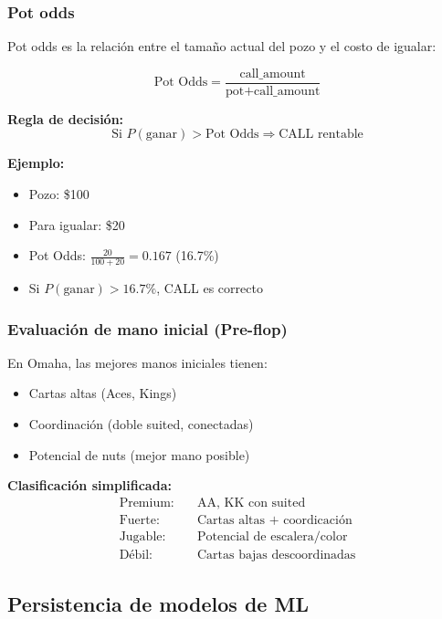 \documentclass[12pt,a4paper]{article}
\begin{document}
\subsubsection{Pot odds}

Pot odds es la relación entre el tamaño actual del pozo y el costo de igualar:

\begin{equation}
    \text{Pot Odds} = \frac{\text{call\_amount}}{\text{pot} + \text{call\_amount}}
\end{equation}

\textbf{Regla de decisión:}
\begin{equation}
    \text{Si } P(\text{ganar}) > \text{Pot Odds} \Rightarrow \text{CALL rentable}
\end{equation}

\textbf{Ejemplo:}
\begin{itemize}
    \item Pozo: \$100
    \item Para igualar: \$20
    \item Pot Odds: $\frac{20}{100+20} = 0.167$ (16.7\%)
    \item Si $P(\text{ganar}) > 16.7\%$, CALL es correcto
\end{itemize}

\subsubsection{Evaluación de mano inicial (Pre-flop)}

En Omaha, las mejores manos iniciales tienen:
\begin{itemize}
    \item Cartas altas (Aces, Kings)
    \item Coordinación (doble suited, conectadas)
    \item Potencial de nuts (mejor mano posible)
\end{itemize}

\textbf{Clasificación simplificada:}
\begin{align}
    \text{Premium:} &\quad \text{AA, KK con suited} \\
    \text{Fuerte:} &\quad \text{Cartas altas + coordicación} \\
    \text{Jugable:} &\quad \text{Potencial de escalera/color} \\
    \text{Débil:} &\quad \text{Cartas bajas descoordinadas}
\end{align}

\subsection{Persistencia de modelos de ML}
\end{document}
